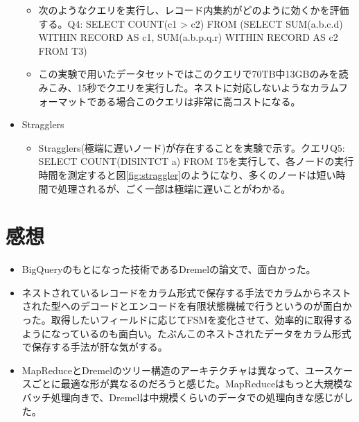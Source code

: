 \documentclass[dvipdfmx,uplatex]{jsarticle}
\theoremstyle{remark}
\newenvironment{experiment}[1]{
    \begin{tcolorbox}[
        colframe=violet,
        colback=violet!10!white,
        colbacktitle=violet!40!white,
        coltitle=black,
        fonttitle=\bfseries,
        title={#1}
    ]
}{
    \end{tcolorbox}
}
\newenvironment{kansou}{
    \begin{tcolorbox}[
        colframe=brown,
        colback=brown!10!white,
        colbacktitle=brown!40!white,
        coltitle=black,fonttitle=\bfseries
    ]
}{
    \end{tcolorbox}
}
\begin{document}
\begin{experiment}{実験結果}
\begin{itemize}
\begin{itemize}
        \item 次のようなクエリを実行し、レコード内集約がどのように効くかを評価する。Q4: SELECT COUNT(c1 > c2) FROM (SELECT SUM(a.b.c.d) WITHIN RECORD AS c1, SUM(a.b.p.q.r) WITHIN RECORD AS c2 FROM T3)
        \item この実験で用いたデータセットではこのクエリで70TB中13GBのみを読みこみ、15秒でクエリを実行した。ネストに対応しないようなカラムフォーマットである場合このクエリは非常に高コストになる。
    \end{itemize}
    \item Stragglers
    \begin{itemize}
        \item Stragglers(極端に遅いノード)が存在することを実験で示す。クエリQ5: SELECT COUNT(DISINTCT a) FROM T5を実行して、各ノードの実行時間を測定すると図\ref{fig:straggler}のようになり、多くのノードは短い時間で処理されるが、ごく一部は極端に遅いことがわかる。
    \end{itemize}
\end{itemize}
\end{experiment}

\section{感想}
\begin{kansou}
\begin{itemize}
  \item BigQueryのもとになった技術であるDremelの論文で、面白かった。
  \item ネストされているレコードをカラム形式で保存する手法でカラムからネストされた型へのデコードとエンコードを有限状態機械で行うというのが面白かった。取得したいフィールドに応じてFSMを変化させて、効率的に取得するようになっているのも面白い。たぶんこのネストされたデータをカラム形式で保存する手法が肝な気がする。
  \item MapReduceとDremelのツリー構造のアーキテクチャは異なって、ユースケースごとに最適な形が異なるのだろうと感じた。MapReduceはもっと大規模なバッチ処理向きで、Dremelは中規模くらいのデータでの処理向きな感じがした。
\end{itemize}
\end{kansou}




\end{document}
